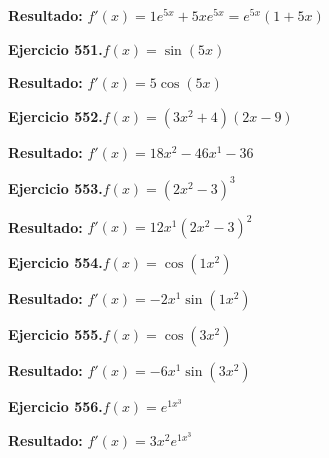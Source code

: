 \documentclass[10pt,a4paper]{article}
\begin{document}
\begin{solbox}
\textbf{Resultado:} \(\displaystyle f'(x) = 1e^{5x} + 5xe^{5x} = e^{5x}(1 + 5x)\)
\end{solbox}

\begin{ejbox}
\textbf{Ejercicio 551.}\quad $f(x) = \sin(5x)$
\end{ejbox}

\begin{solbox}
\textbf{Resultado:} \(\displaystyle f'(x) = 5\cos(5x)\)
\end{solbox}

\begin{ejbox}
\textbf{Ejercicio 552.}\quad $f(x) = (3x^{2} +4)(2x -9)$
\end{ejbox}

\begin{solbox}
\textbf{Resultado:} \(\displaystyle f'(x) = 18x^{2} -46x^{1} -36\)
\end{solbox}

\newpage
\begin{ejbox}
\textbf{Ejercicio 553.}\quad $f(x) = (2x^{2} -3)^{3}$
\end{ejbox}

\begin{solbox}
\textbf{Resultado:} \(\displaystyle f'(x) = 12x^{1}(2x^{2} -3)^{2}\)
\end{solbox}

\begin{ejbox}
\textbf{Ejercicio 554.}\quad $f(x) = \cos(1x^{2})$
\end{ejbox}

\begin{solbox}
\textbf{Resultado:} \(\displaystyle f'(x) = -2x^{1}\sin(1x^{2})\)
\end{solbox}

\begin{ejbox}
\textbf{Ejercicio 555.}\quad $f(x) = \cos(3x^{2})$
\end{ejbox}

\begin{solbox}
\textbf{Resultado:} \(\displaystyle f'(x) = -6x^{1}\sin(3x^{2})\)
\end{solbox}

\newpage
\begin{ejbox}
\textbf{Ejercicio 556.}\quad $f(x) = e^{1x^{3}}$
\end{ejbox}

\begin{solbox}
\textbf{Resultado:} \(\displaystyle f'(x) = 3x^{2}e^{1x^{3}}\)
\end{solbox}
\end{document}
